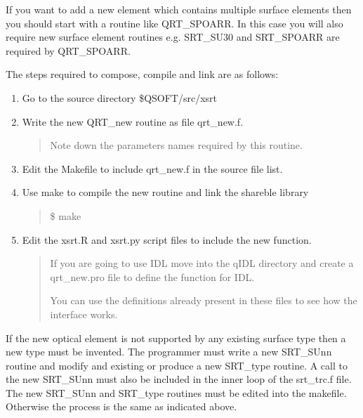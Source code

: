 \documentclass[letterpaper,10pt,english]{sphinxmanual}
\begin{document}
If you want to add a new element which contains multiple surface elements then
you should start with a routine like QRT\_SPOARR. In this case
you will also require
new surface element routines e.g. SRT\_SU30 and SRT\_SPOARR are
required by QRT\_SPOARR.

The steps required to compose, compile and link are as follows:
\begin{enumerate}
\def\theenumi{\arabic{enumi}}
\def\labelenumi{\theenumi .}
\makeatletter\def\p@enumii{\p@enumi \theenumi .}\makeatother
\item {} 
Go to the source directory \$QSOFT/src/xsrt

\item {} 
Write the new QRT\_new routine as file qrt\_new.f.
\begin{quote}

Note down the parameters names required by this routine.
\end{quote}

\item {} 
Edit the Makefile to include qrt\_new.f in the source file list.

\item {} 
Use make to compile the new routine and link the shareble library
\begin{quote}

\$ make
\end{quote}

\item {} 
Edit the xsrt.R and xsrt.py script files to include the new function.
\begin{quote}

If you are going to use IDL move into the qIDL directory and create
a qrt\_new.pro file to define the function for IDL.

You can use the definitions already present in these files
to see how the interface works.
\end{quote}

\end{enumerate}

If the new optical element is not supported by any existing surface
type then a new type must be invented. The programmer must write
a new SRT\_SUnn routine and modify and existing
or produce a new SRT\_type routine.
A call to the new SRT\_SUnn must also be included in the inner loop
of the srt\_trc.f file. The new SRT\_SUnn and SRT\_type routines
must be edited into the makefile. Otherwise the process is
the same as indicated above.
\end{document}

